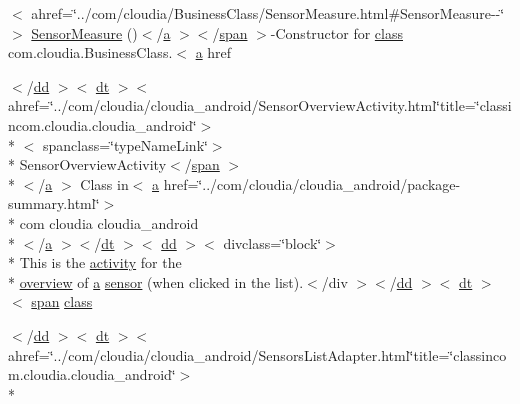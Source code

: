 \begin{DoxyCompactItemize}
$<$ ahref=\char`\"{}../com/cloudia/Business\-Class/Sensor\-Measure.\-html\#Sensor\-Measure-\/-\/\char`\"{}$>$ \hyperlink{index-17_8html_a90da4d2bd05f55727aa2be4b4060a5ef}{Sensor\-Measure} ()$<$/\hyperlink{style_8css_a5e8981582017bb8b84c21f148345d1f7}{a} $>$$<$/\hyperlink{stylesheet_8css_a8343996ebcf16220b04e54659aac31cc}{span} $>$-\/Constructor for \hyperlink{_tools_8html_acf06f836132665ba8114f5a414c2403f}{class} com.\-cloudia.\-Business\-Class.$<$ \hyperlink{style_8css_a5e8981582017bb8b84c21f148345d1f7}{a} href
\item 
$<$/\hyperlink{stylesheet_8css_a47f4718a86835a7771ec592ece845221}{dd} $>$$<$ \hyperlink{stylesheet_8css_a107565fb4039d33b041380d6e0ea1d80}{dt} $>$$<$ ahref=\char`\"{}../com/cloudia/cloudia\-\_\-android/Sensor\-Overview\-Activity.\-html\char`\"{}title=\char`\"{}classincom.\-cloudia.\-cloudia\-\_\-android\char`\"{}$>$\\*
$<$ spanclass=\char`\"{}type\-Name\-Link\char`\"{}$>$\\*
 Sensor\-Overview\-Activity$<$/\hyperlink{stylesheet_8css_a8343996ebcf16220b04e54659aac31cc}{span} $>$\\*
$<$/\hyperlink{style_8css_a5e8981582017bb8b84c21f148345d1f7}{a} $>$ Class in$<$ \hyperlink{style_8css_a5e8981582017bb8b84c21f148345d1f7}{a} href=\char`\"{}../com/cloudia/cloudia\-\_\-android/package-\/summary.\-html\char`\"{}$>$\\*
 com cloudia cloudia\-\_\-android\\*
$<$/\hyperlink{style_8css_a5e8981582017bb8b84c21f148345d1f7}{a} $>$$<$/\hyperlink{stylesheet_8css_a107565fb4039d33b041380d6e0ea1d80}{dt} $>$$<$ \hyperlink{stylesheet_8css_a47f4718a86835a7771ec592ece845221}{dd} $>$$<$ divclass=\char`\"{}block\char`\"{}$>$\\*
 This is the \hyperlink{_sensor_activity_8html_a27ce96cb0fb53311961cb30579c7f77e}{activity} for the \\*
\hyperlink{_sensor_overview_activity_8html_a8a9eb4928f27f52b33c3510380ee5501}{overview} of \hyperlink{style_8css_a5e8981582017bb8b84c21f148345d1f7}{a} \hyperlink{index-17_8html_a473de8198e1708e7f705d9a565cff824}{sensor} (when clicked in the list).$<$/div $>$$<$/\hyperlink{stylesheet_8css_a47f4718a86835a7771ec592ece845221}{dd} $>$$<$ \hyperlink{stylesheet_8css_a107565fb4039d33b041380d6e0ea1d80}{dt} $>$$<$ \hyperlink{stylesheet_8css_a8343996ebcf16220b04e54659aac31cc}{span} \hyperlink{_tools_8html_acf06f836132665ba8114f5a414c2403f}{class}
\item 
$<$/\hyperlink{stylesheet_8css_a47f4718a86835a7771ec592ece845221}{dd} $>$$<$ \hyperlink{stylesheet_8css_a107565fb4039d33b041380d6e0ea1d80}{dt} $>$$<$ ahref=\char`\"{}../com/cloudia/cloudia\-\_\-android/Sensors\-List\-Adapter.\-html\char`\"{}title=\char`\"{}classincom.\-cloudia.\-cloudia\-\_\-android\char`\"{}$>$\\*
$$
\end{DoxyCompactItemize}
